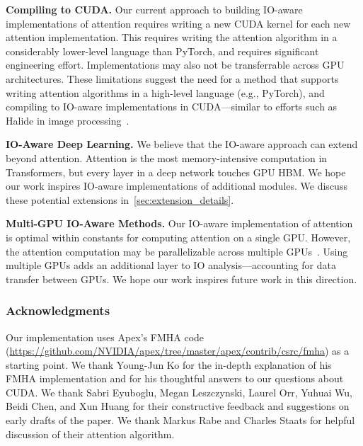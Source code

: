 \textbf{Compiling to CUDA.} Our current approach to building IO-aware implementations of attention requires writing a new CUDA kernel for each new attention implementation. This requires writing the attention algorithm in a considerably lower-level language than PyTorch, and requires significant engineering effort. Implementations may also not be transferrable across GPU architectures. These limitations suggest the need for a method that supports writing attention algorithms in a high-level language (e.g., PyTorch), and compiling to IO-aware implementations in CUDA---similar to efforts such as Halide in image processing~\citep{ragan2013halide}.

\textbf{IO-Aware Deep Learning.} We believe that the IO-aware approach can extend beyond attention. Attention is the most memory-intensive computation in Transformers, but every layer in a deep network touches GPU HBM. We hope our work inspires IO-aware implementations of additional modules. We discuss these potential extensions in~\ref{sec:extension_details}.

\textbf{Multi-GPU IO-Aware Methods.} Our IO-aware implementation of attention is optimal within constants for computing attention on a single GPU. However, the attention computation may be parallelizable across multiple GPUs~\citep{recht2013parallel}. Using multiple GPUs adds an additional layer to IO analysis---accounting for data transfer between GPUs. We hope our work inspires future work in this direction.

\subsubsection*{Acknowledgments}

Our implementation uses Apex's FMHA code (\url{https://github.com/NVIDIA/apex/tree/master/apex/contrib/csrc/fmha}) as a starting point. We thank Young-Jun Ko for the in-depth explanation of his FMHA implementation and for his thoughtful answers to our questions about CUDA. We thank Sabri Eyuboglu, Megan Leszczynski, Laurel Orr, Yuhuai Wu, Beidi Chen, and Xun Huang for their constructive feedback and suggestions on early drafts of the paper. We thank Markus Rabe and Charles Staats for helpful discussion of their attention algorithm.

